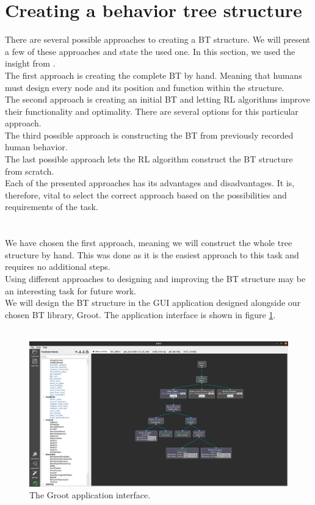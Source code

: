 \section{Creating a behavior tree structure}
    There are several possible approaches to creating a BT structure. We will present a few of these approaches and state the used one. In this section, we used the insight from \cite{BT_creation}.\\
    The first approach is creating the complete BT by hand. Meaning that humans must design every node and its position and function within the structure.\\
    The second approach is creating an initial BT and letting RL algorithms improve their functionality and optimality. There are several options for this particular approach.\\
    The third possible approach is constructing the BT from previously recorded human behavior.\\
    The last possible approach lets the RL algorithm construct the BT structure from scratch.\\
    Each of the presented approaches has its advantages and disadvantages. It is, therefore, vital to select the correct approach based on the possibilities and requirements of the task.\\\\
    \\
        We have chosen the first approach, meaning we will construct the whole tree structure by hand. This was done as it is the easiest approach to this task and requires no additional steps.\\
        Using different approaches to designing and improving the BT structure may be an interesting task for future work.\\
        We will design the BT structure in the GUI application designed alongside our chosen BT library, Groot. The application interface is shown in figure \ref{fig:groot}.\\\\
        \begin{figure}[ht]
            \centering
            \includegraphics[width=\linewidth]{images/Groot.png}
            \caption{The Groot application interface.}
            \label{fig:groot}
        \end{figure}
    

